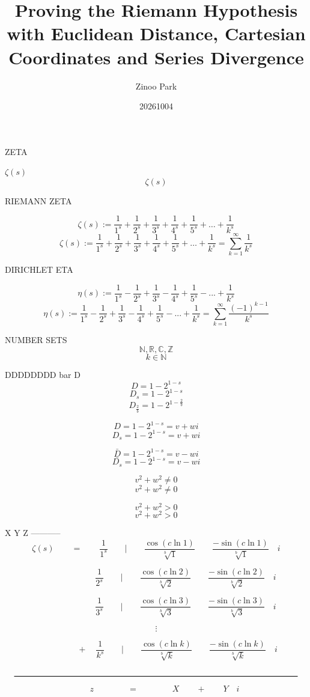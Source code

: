 \documentclass{amsart}
\title[RH Euclidean Cartesian]{Proving the Riemann Hypothesis \\
	with Euclidean Distance, Cartesian Coordinates and Series Divergence}
\author{Zinoo Park}
\date{20261004}
\begin{document}
	
	ZETA
	
	$\zeta(s)$
	\[ \zeta(s) \]
	
	RIEMANN ZETA
	
	\[ \zeta(s) := \frac{1}{1^s} + \frac{1}{2^s} + \frac{1}{3^s} + \frac{1}{4^s} + \frac{1}{5^s} + {\dots} + \frac{1}{k^s} \]
	\[ \zeta(s) := \frac{1}{1^s} + \frac{1}{2^s} + \frac{1}{3^s} + \frac{1}{4^s} + \frac{1}{5^s} + {\dots} + \frac{1}{k^s} = \sum\limits_{k=1}^{\infty}\frac{1}{k^s} \]
	
	
	DIRICHLET ETA
	
	\[ \eta(s) := \frac{1}{1^s} - \frac{1}{2^s} + \frac{1}{3^s} - \frac{1}{4^s} + \frac{1}{5^s} - ... + \frac{1}{k^s} \]
	\[ \eta(s) := \frac{1}{1^s} - \frac{1}{2^s} + \frac{1}{3^s} - \frac{1}{4^s} + \frac{1}{5^s} - ... + \frac{1}{k^s} = \sum\limits_{k=1}^{\infty}\frac{(-1)^{k-1}}{k^s} \]
	
	NUMBER SETS
	\[ \mathbb{N}, \mathbb{R}, \mathbb{C}, \mathbb{Z} \]
	\[ k \in \mathbb{N} \]
	
	DDDDDDDD bar D
	\[ D = 1-2^{1-s} \]
	\[ D_{s} = 1-2^{1-s} \]
	\[ D_{\frac{2}{b}} = 1-2^{1-\frac{2}{b}} \]
	
	\[ D = 1-2^{1-s} = v + wi \]
	\[ D_{s} = 1-2^{1-s} = v + wi \]
	
	\[ \bar{D} = 1-2^{1-s} = v - wi \]
	\[ \bar{D_{s}} = 1-2^{1-s} = v - wi \]
	
	\[ v^2 + w^2 \neq 0 \]
	\[ v^2 {+} w^2 \neq 0 \]
	
	\[ v^2 + w^2 > 0 \]
	\[ v^2 {+} w^2 > 0 \]
	
	
	\newpage
	
	X Y Z -----------
	\[ \zeta(s) \qquad = \qquad \frac{1}{1^s} \qquad \Big|  \qquad \frac{\cos({c\ln 1})}{\sqrt[b]{1}} \qquad \frac{-\sin({c\ln 1})}{\sqrt[b]{1}} \quad i  \]
	
	\[ \quad \qquad  \qquad \qquad \frac{1}{2^s} \qquad \Big|  \qquad \frac{\cos({c\ln 2})}{\sqrt[b]{2}} \qquad \frac{-\sin({c\ln 2})}{\sqrt[b]{2}} \quad i  \]
	
	\[ \quad \qquad  \qquad \qquad \frac{1}{3^s} \qquad \Big|  \qquad \frac{\cos({c\ln 3})}{\sqrt[b]{3}} \qquad \frac{-\sin({c\ln 3})}{\sqrt[b]{3}} \quad i  \]
	
	\[ \vdots \]
	
	\[ \qquad \qquad \quad + \quad \frac{1}{k^s} \qquad \Big|  \qquad \frac{\cos({c\ln k})}{\sqrt[b]{k}} \qquad \frac{-\sin({c\ln k})}{\sqrt[b]{k}} \quad i  \]
	
	\[\quad \rule{12 cm}{.8pt} \quad \]
	\[ \qquad \qquad \qquad z \qquad\qquad =  \qquad\qquad X \qquad + \qquad Y \quad i \qquad\qquad \]
	
\end{document}
